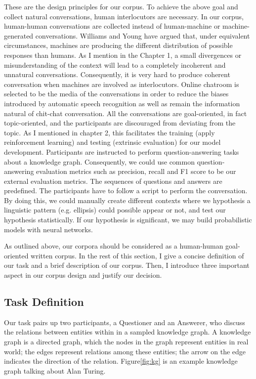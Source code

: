 \documentclass[bsc,frontabs,twoside,singlespacing,parskip,deptreport]{infthesis}     %
\begin{document}
These are the design principles for our corpus. To achieve the above goal and collect natural conversations, human interlocutors are necessary. In our corpus, human-human conversations are collected instead of human-machine or machine-generated conversations. Williams and Young\cite{williams2007partially} have argued that, under equivalent circumstances, machines are producing the different distribution of possible responses than humans. As I mention in the Chapter 1, a small divergences or misunderstanding of the context will lead to a completely incoherent and unnatural conversations. Consequently, it is very hard to produce coherent conversation when machines are involved as interlocutors. Online chatroom is selected to be the media of the conversations in order to reduce the biases introduced by automatic speech recognition\cite{williams2007partially} as well as remain the information natural of chit-chat conversation. All the conversations are goal-oriented, in fact topic-oriented, and the participants are discouraged from deviating from the topic. As I mentioned in chapter 2, this facilitates the training (apply reinforcement learning) and testing (extrinsic evaluation) for our model development. Participants are instructed to perform question-answering tasks about a knowledge graph. Consequently, we could use common question-answering evaluation metrics such as precision, recall and F1 score to be our external evaluation metrics. The sequences of questions and answers are predefined. The participants have to follow a script to perform the conversation. By doing this, we could manually create different contexts where we hypothesis a linguistic pattern (e.g. ellipsis) could possible appear or not, and test our hypothesis statistically. If our hypothesis is significant, we may build probabilistic models with neural networks.

As outlined above, our corpora should be considered as a human-human goal-oriented written corpus. In the rest of this section, I give a concise definition of our task and a brief description of our corpus. Then, I introduce three important aspect in our corpus design and justify our decision.

\subsection{Task Definition}

Our task pairs up two participants, a Questioner and an Answerer, who discuss the relations between entities within in a sampled knowledge graph. A knowledge graph is a directed graph, which the nodes in the graph represent entities in real world; the edges represent relations among these entities; the arrow on the edge indicates the direction of the relation. Figure\ref{fig:kg} is an example knowledge graph talking about Alan Turing. 
\end{document}
